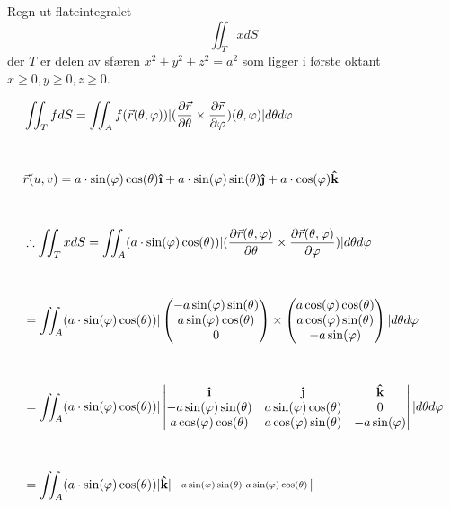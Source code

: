 \documentclass{../../myassignment}
\newcommand{\uvec}[1]{\boldsymbol{\hat{\textbf{#1}}}}
\begin{document}
	\begin{problem}
		Regn ut flateintegralet $$\iint_T x dS$$ der $T$ er delen av sfæren $x^2+y^2+z^2=a^2$ som ligger i første oktant $x\geq0, y\geq0, z\geq0$.
	\end{problem}

	\begin{answer}
		\begin{align*}
			&\iint_T f dS = \iint_A f(\vec{r}(\theta,\varphi))\vert(\frac{\partial\vec{r}}{\partial \theta}\times{\frac{\partial \vec{r}}{\partial \varphi}})(\theta, \varphi)\vert  d \theta d \varphi \\[1cm]
			&\vec{r}(u,v) = a \cdot \sin(\varphi)\cos(\theta) \uvec{\i} + a \cdot \sin(\varphi)\sin(\theta) \uvec{\j} + a \cdot \cos(\varphi)\uvec{k}\\[1cm]
			&\therefore \iint_T x dS = \iint_A (a \cdot \sin(\varphi)\cos(\theta))\vert(\frac{\partial\vec{r}(\theta, \varphi)}{\partial \theta}\times{\frac{\partial \vec{r}(\theta, \varphi)}{\partial \varphi}})\vert  d \theta d \varphi \\[1cm]
			&= \iint_A (a \cdot \sin(\varphi)\cos(\theta)) \vert
				\begin{pmatrix}
					-a\sin(\varphi)\sin(\theta) \\
					a\sin(\varphi)\cos(\theta) \\
					0
				\end{pmatrix} \times 
				\begin{pmatrix}
					a\cos(\varphi)\cos(\theta) \\
					a\cos(\varphi)\sin(\theta) \\
					-a\sin(\varphi)
				\end{pmatrix}
					\vert  d \theta d \varphi \\[1cm]
				&= \iint_A (a \cdot \sin(\varphi)\cos(\theta)) \vert
				\begin{vmatrix}
					\uvec{\i} & \uvec{\j} & \uvec{k}\\
					-a\sin(\varphi)\sin(\theta) &
						a\sin(\varphi)\cos(\theta) &
						0 \\
					a\cos(\varphi)\cos(\theta) &
						a\cos(\varphi)\sin(\theta) &
						-a\sin(\varphi)
				\end{vmatrix}
					\vert  d \theta d \varphi \\[1cm]
				&= \iint_A (a \cdot \sin(\varphi)\cos(\theta)) \vert
				\uvec{k}
				\begin{vsmallmatrix}
					-a\sin(\varphi)\sin(\theta) &
						a\sin(\varphi)\cos(\theta) \\

\end{vsmallmatrix}
\end{align*}
\end{answer}
\end{document}
